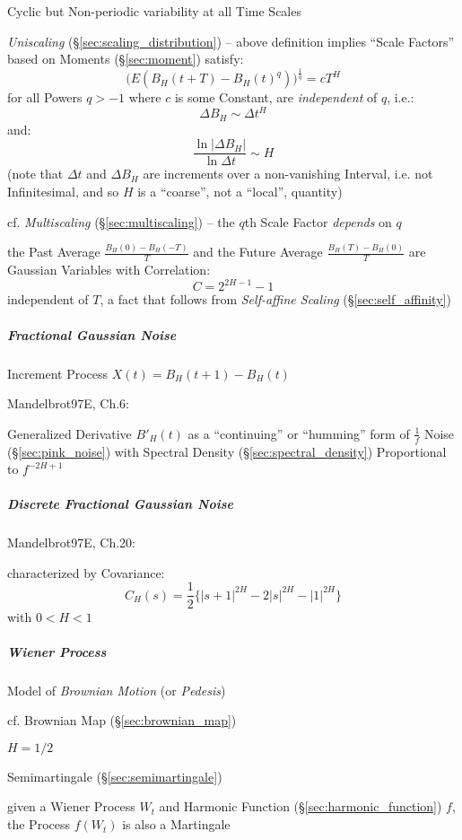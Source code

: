 Cyclic but Non-periodic variability at all Time Scales

\emph{Uniscaling} (\S\ref{sec:scaling_distribution}) -- above definition implies
``Scale Factors'' based on Moments (\S\ref{sec:moment}) satisfy:
\[
  \Big(E(B_H(t + T) - B_H(t)^q)\Big)^{\frac{1}{q}} = c T^H
\]
for all Powers $q > -1$ where $c$ is some Constant, are \emph{independent} of
$q$, i.e.:
\[
  \Delta B_H \sim \Delta t^H
\]
and:
\[
  \frac{\ln|\Delta B_H|}{\ln \Delta{t}} \sim H
\]
(note that $\Delta t$ and $\Delta B_H$ are increments over a non-vanishing
Interval, i.e. not Infinitesimal, and so $H$ is a ``coarse'', not a ``local'',
quantity)

cf. \emph{Multiscaling} (\S\ref{sec:multiscaling}) -- the $q$th Scale Factor
\emph{depends} on $q$

the Past Average $\frac{B_H(0) - B_H(-T)}{T}$ and the Future Average
$\frac{B_H(T) - B_H(0)}{T}$ are Gaussian Variables with Correlation:
\[
  C = 2^{2H-1} - 1
\]
independent of $T$, a fact that follows from \emph{Self-affine Scaling}
(\S\ref{sec:self_affinity})



\subparagraph{Fractional Gaussian Noise}\label{sec:fractional_gaussian}\hfill

Increment Process $X(t) = B_H(t+1) - B_H(t)$

Mandelbrot97E, Ch.6:

Generalized Derivative $B'_H(t)$ as a ``continuing'' or ``humming'' form of
$\frac{1}{f}$ Noise (\S\ref{sec:pink_noise}) with Spectral Density
(\S\ref{sec:spectral_density}) Proportional to $f^{-2H+1}$



\subparagraph{Discrete Fractional Gaussian Noise}\label{sec:dfgn}\hfill

Mandelbrot97E, Ch.20:

characterized by Covariance:
\[
  C_H(s) = \frac{1}{2} \{ |s+1|^{2H} - 2|s|^{2H} - |1|^{2H} \}
\]
with $0 < H < 1$



\subparagraph{Wiener Process}\label{sec:wiener_process}\hfill

Model of \emph{Brownian Motion} (or \emph{Pedesis})

\fist cf. Brownian Map (\S\ref{sec:brownian_map})

$H = 1/2$

Semimartingale (\S\ref{sec:semimartingale})

given a Wiener Process $W_t$ and Harmonic Function
(\S\ref{sec:harmonic_function}) $f$, the Process $f(W_t)$ is also a Martingale

